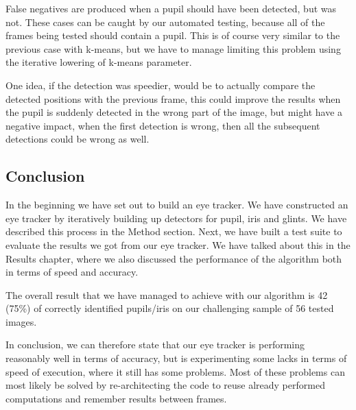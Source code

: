 False negatives are produced when a pupil should have been detected, but was not. These cases can be caught by our automated testing, because all of the frames being tested should contain a pupil. This is of course very similar to the previous case with k-means, but we have to manage limiting this problem using the iterative lowering of k-means parameter.

One idea, if the detection was speedier, would be to actually compare the detected positions with the previous frame, this could improve the results when the pupil is suddenly detected in the wrong part of the image, but might have a negative impact, when the first detection is wrong, then all the subsequent detections could be wrong as well.


\subsection{Conclusion}
In the beginning we have set out to build an eye tracker. We have constructed an eye tracker by iteratively building up detectors for pupil, iris and glints. We have described this process in the Method section. Next, we have built a test suite to evaluate the results we got from our eye tracker. We have talked about this in the Results chapter, where we also discussed the performance of the algorithm both in terms of speed and accuracy.

The overall result that we have managed to achieve with our algorithm is 42 (75\%) of correctly identified pupils/iris on our challenging sample of 56 tested images.

In conclusion, we can therefore state that our eye tracker is performing reasonably well in terms of accuracy, but is experimenting some lacks in terms of speed of execution, where it still has some problems. Most of these problems can most likely be solved by re-architecting the code to reuse already performed computations and remember results between frames.
